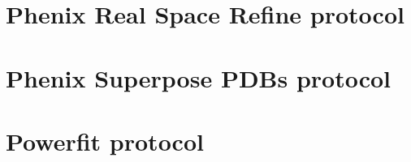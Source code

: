 \documentclass[12pt]{article} %
\begin{document}
\begin{appendices}
\section{Phenix Real Space Refine protocol}
\label{app:realSpaceRefineProtocol}

\section{Phenix Superpose PDBs protocol}
\label{app:superposePdbsProtocol}

\section{Powerfit protocol}
\label{app:powerfitProtocol}








\end{appendices}
\end{document}
